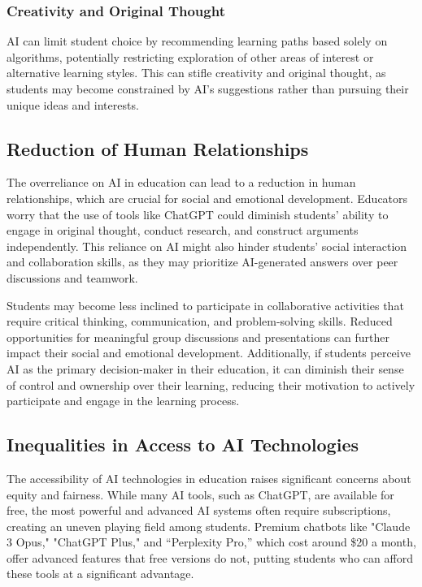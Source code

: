 \documentclass{article}
\begin{document}
\subsubsection{Creativity and Original Thought}

AI can limit student choice by recommending learning paths based solely on algorithms, potentially restricting exploration of other areas of interest or alternative learning styles. This can stifle creativity and original thought, as students may become constrained by AI's suggestions rather than pursuing their unique ideas and interests.

\subsection{Reduction of Human Relationships}

The overreliance on AI in education can lead to a reduction in human relationships, which are crucial for social and emotional development. Educators worry that the use of tools like ChatGPT could diminish students' ability to engage in original thought, conduct research, and construct arguments independently. This reliance on AI might also hinder students' social interaction and collaboration skills, as they may prioritize AI-generated answers over peer discussions and teamwork.

Students may become less inclined to participate in collaborative activities that require critical thinking, communication, and problem-solving skills. Reduced opportunities for meaningful group discussions and presentations can further impact their social and emotional development. Additionally, if students perceive AI as the primary decision-maker in their education, it can diminish their sense of control and ownership over their learning, reducing their motivation to actively participate and engage in the learning process.

\subsection{Inequalities in Access to AI Technologies}

The accessibility of AI technologies in education raises significant concerns about equity and fairness. While many AI tools, such as ChatGPT, are available for free, the most powerful and advanced AI systems often require subscriptions, creating an uneven playing field among students. Premium chatbots like "Claude 3 Opus," "ChatGPT Plus," and “Perplexity Pro,” which cost around \$20 a month, %
offer advanced features that free versions do not, putting students who can afford these tools at a significant advantage.
\end{document}
